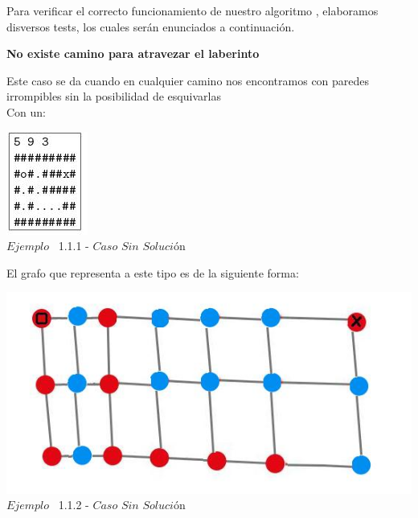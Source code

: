 \indent Para verificar el correcto funcionamiento de nuestro algoritmo , elaboramos disversos tests,
los cuales ser\'an enunciados a continuaci\'on.\\

\begin{center}
 \textbf{No existe camino para atravezar el laberinto}
\end{center}

Este caso se da cuando en cualquier camino nos encontramos con paredes irrompibles sin la posibilidad de esquivarlas\\

 Con un:
 
\vspace*{0.3cm} \vspace*{0.3cm}
  \begin{center}
 \includegraphics[scale=0.65]{./EJ1/ej1sinsolucion.jpeg}
\\{$Ejemplo$ \ 1.1.1 - $Caso$ $Sin$ $Soluci$\'on}
  \end{center}
  \vspace*{0.3cm}

El grafo que representa a este tipo es de la siguiente forma:\\

\vspace*{0.3cm} \vspace*{0.3cm}
  \begin{center}
 \includegraphics[scale=0.5]{./EJ1/ej1grafosinsolucion.jpeg}
 \\{$Ejemplo$ \ 1.1.2 - $Caso$ $Sin$ $Soluci$\'on}
  \end{center}
  \vspace*{0.3cm}


